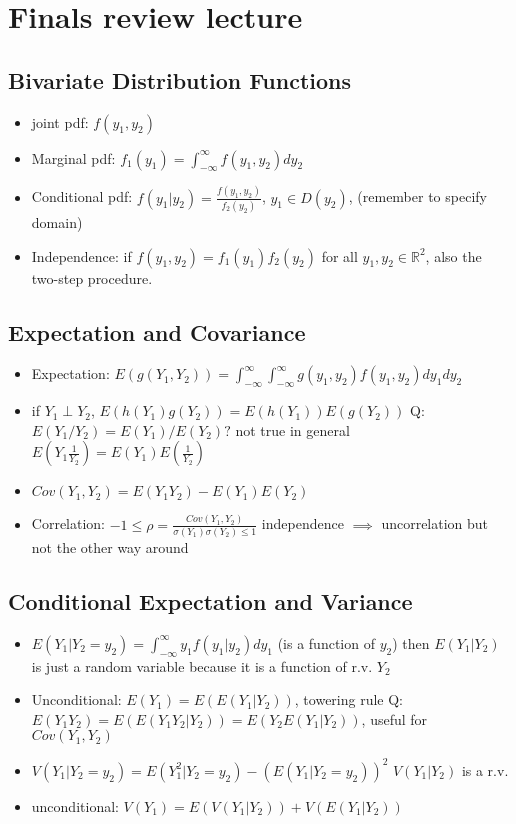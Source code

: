 \documentclass{report}
\begin{document}
\chapter{Finals review lecture}
\section{Bivariate Distribution Functions}
\begin{itemize}
	\item joint pdf: $f(y_1,y_2)$
	\item Marginal pdf: $f_1(y_1) = \int_{-\infty}^{\infty}f(y_1,y_2)dy_2$
	\item Conditional pdf: $f(y_1 | y_2) = \frac{f(y_1,y_2)}{f_2(y_2)}$, \quad $y_1 \in D(y_2)$, (remember to specify domain)
	\item Independence: if $f(y_1,y_2) = f_1(y_1)f_2(y_2)$ for all $y_1,y_2 \in \mathbb{R}^2$, also the two-step procedure.
\end{itemize}
\section{Expectation and Covariance}
\begin{itemize}
	\item Expectation: $E(g(Y_1,Y_2)) = \int_{-\infty}^{\infty}\int_{-\infty}^{\infty}g(y_1,y_2)f(y_1,y_2)dy_1dy_2$
	\item if $Y_1 \perp Y_2$, $E(h(Y_1)g(Y_2)) = E(h(Y_1))E(g(Y_2))$ 
	\subitem Q: $E(Y_1/Y_2) = E(Y_1)/E(Y_2)?$ \quad not true in general
	$E(Y_1\frac{1}{Y_2}) = E(Y_1)E(\frac{1}{Y_2})$
	\item $Cov(Y_1,Y_2) = E(Y_1Y_2) - E(Y_1)E(Y_2)$
	\item Correlation: $-1 \leq \rho = \frac{Cov(Y_1,Y_2)}{\sigma(Y_1)\sigma(Y_2) \leq 1}$
	\subitem independence $\implies$ uncorrelation but not the other way around
\end{itemize}
\section{Conditional Expectation and Variance}
\begin{itemize}
	\item $E(Y_1|Y_2 = y_2) = \int_{-\infty}^{\infty}y_1f(y_1|y_2)dy_1$ (is a function of $y_2$)
	\subitem then $E(Y_1|Y_2)$ is just a random variable because it is a function of r.v. $Y_2$
	\item Unconditional: $E(Y_1) = E(E(Y_1|Y_2))$, towering rule
	\subitem Q:$E(Y_1Y_2) = E(E(Y_1Y_2|Y_2)) = E(Y_2E(Y_1|Y_2))$, useful for $Cov(Y_1,Y_2)$
	\item $V(Y_1|Y_2 = y_2) = E(Y_1^2|Y_2 = y_2) - (E(Y_1|Y_2 = y_2))^2$
	\subitem $V(Y_1|Y_2)$ is a r.v.
	\item unconditional: $V(Y_1) = E(V(Y_1|Y_2)) + V(E(Y_1|Y_2))$
\end{itemize}
\end{document}
